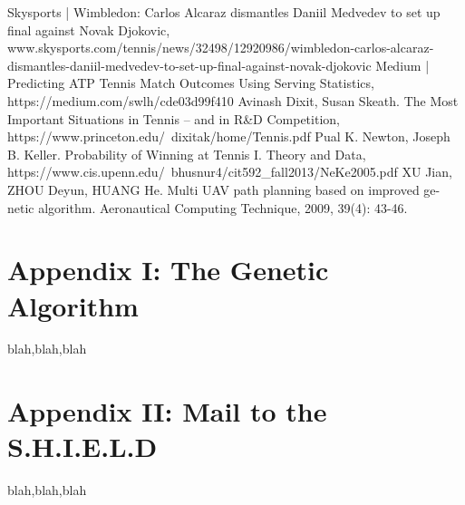 \documentclass[12pt]{article}  %
\begin{document}

\clearpage   
\begin{thebibliography}{99}
     Skysports | Wimbledon: Carlos Alcaraz dismantles Daniil Medvedev to set up final against Novak Djokovic,  www.skysports.com/tennis/news/32498/12920986/wimbledon-carlos-alcaraz-dismantles-daniil-medvedev-to-set-up-final-against-novak-djokovic
	 Medium | Predicting ATP Tennis Match Outcomes Using Serving Statistics, https://medium.com/swlh/cde03d99f410
	 Avinash Dixit, Susan Skeath. The Most Important Situations in Tennis – and in R\&D Competition, https://www.princeton.edu/~dixitak/home/Tennis.pdf
	 Pual K. Newton, Joseph B. Keller. Probability of Winning at Tennis I. Theory and Data, https://www.cis.upenn.edu/~bhusnur4/cit592\_fall2013/NeKe2005.pdf
	 XU Jian, ZHOU Deyun, HUANG He. Multi UAV path planning based on improved ge-netic algorithm. Aeronautical Computing Technique, 2009, 39(4): 43-46.

\end{thebibliography}

\appendix
\section{Appendix I: The Genetic Algorithm}
blah,blah,blah

\section{Appendix II: Mail to the S.H.I.E.L.D}
blah,blah,blah





\end{document}
